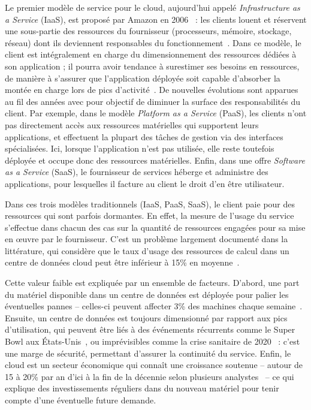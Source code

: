 Le premier modèle de service pour le cloud, aujourd'hui appelé \textit{Infrastructure as a Service} (\gls{IaaS}), est proposé par Amazon en 2006~\cite{AmazonEC2Beta2006} : les clients louent et réservent une sous-partie des ressources du fournisseur (processeurs, mémoire, stockage, réseau) dont ils deviennent responsables du fonctionnement~\cite{mellNISTDefinitionCloud}. Dans ce modèle, le client est intégralement en charge du dimensionnement des ressources dédiées à son application ; il pourra avoir tendance à surestimer ses besoins en ressources, de manière à s'assurer que l'application déployée soit capable d'absorber la montée en charge lors de pics d'activité~\cite{takMoveNotMove}. De nouvelles évolutions sont apparues au fil des années avec pour objectif de diminuer la surface des responsabilités du client. Par exemple, dans le modèle \textit{Platform as a Service} (\gls{PaaS}), les clients n'ont pas directement accès aux ressources matérielles qui supportent leurs applications, et effectuent la plupart des tâches de gestion via des interfaces spécialisées. Ici, lorsque l'application n'est pas utilisée, elle reste toutefois déployée et occupe donc des ressources matérielles. Enfin, dans une offre \textit{Software as a Service} (\gls{SaaS}), le fournisseur de services héberge et administre des applications, pour lesquelles il facture au client le droit d'en être utilisateur. %

Dans ces trois modèles traditionnels (\gls{IaaS}, \gls{PaaS}, \gls{SaaS}), le client paie pour des ressources qui sont parfois dormantes. En effet, la mesure de l'usage du service s'effectue dans chacun des cas sur la quantité de ressources engagées pour sa mise en œuvre par le fournisseur. C'est un problème largement documenté dans la littérature, qui considère que le taux d'usage des ressources de calcul dans un centre de données cloud peut être inférieur à 15\% en moyenne~\cite{vasanWorthTheirWatts2010, vermaLargescaleClusterManagement2015a}.

Cette valeur faible est expliquée par un ensemble de facteurs. D'abord, une part du matériel disponible dans un centre de données est déployée pour palier les éventuelles pannes -- celles-ci peuvent affecter 3\% des machines chaque semaine~\cite{BareMetal70B}. Ensuite, un centre de données est toujours dimensionné par rapport aux pics d'utilisation, qui peuvent être liés à des événements récurrents comme le Super Bowl aux États-Unis~\cite{wangTouchdownCloudImpact2019}, ou imprévisibles comme la crise sanitaire de 2020~\cite{alashhabImpactCoronavirusPandemic2021} : c'est une marge de sécurité, permettant d'assurer la continuité du service. Enfin, le cloud est un secteur économique qui connaît une croissance soutenue -- autour de 15 à 20\% par an d'ici à la fin de la décennie selon plusieurs analystes~\cite{CloudComputingMarket, WorldwideSpendingPublic} -- ce qui explique des investissements réguliers dans du nouveau matériel pour tenir compte d'une éventuelle future demande.

